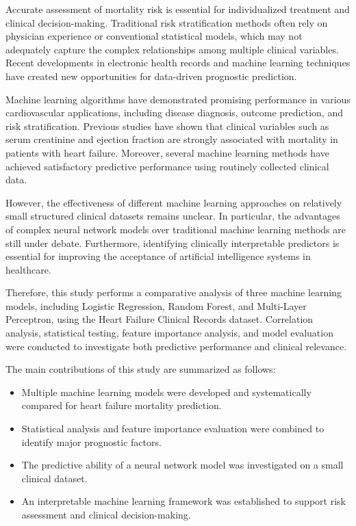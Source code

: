 \documentclass[twocolumn]{article}
\begin{document}
Accurate assessment of mortality risk is essential for individualized treatment and clinical decision-making. Traditional risk stratification methods often rely on physician experience or conventional statistical models, which may not adequately capture the complex relationships among multiple clinical variables. Recent developments in electronic health records and machine learning techniques have created new opportunities for data-driven prognostic prediction.

Machine learning algorithms have demonstrated promising performance in various cardiovascular applications, including disease diagnosis, outcome prediction, and risk stratification.\cite{bzdok2018} Previous studies have shown that clinical variables such as serum creatinine and ejection fraction are strongly associated with mortality in patients with heart failure.\cite{chicco2020} Moreover, several machine learning methods have achieved satisfactory predictive performance using routinely collected clinical data. 

However, the effectiveness of different machine learning approaches on relatively small structured clinical datasets remains unclear. In particular, the advantages of complex neural network models over traditional machine learning methods are still under debate. Furthermore, identifying clinically interpretable predictors is essential for improving the acceptance of artificial intelligence systems in healthcare.

Therefore, this study performs a comparative analysis of three machine learning models, including Logistic Regression, Random Forest, and Multi-Layer Perceptron, using the Heart Failure Clinical Records dataset. Correlation analysis, statistical testing, feature importance analysis, and model evaluation were conducted to investigate both predictive performance and clinical relevance.

The main contributions of this study are summarized as follows:

\begin{itemize}

\item Multiple machine learning models were developed and systematically compared for heart failure mortality prediction.

\item Statistical analysis and feature importance evaluation were combined to identify major prognostic factors.

\item The predictive ability of a neural network model was investigated on a small clinical dataset.

\item An interpretable machine learning framework was established to support risk assessment and clinical decision-making.

\end{itemize}
\end{document}

